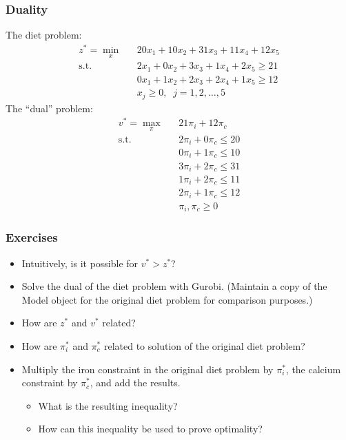 \documentclass[12pt,handout]{beamer}
\begin{document}
\begin{frame}
\frametitle{Duality}
\small
The diet problem:
\begin{eqnarray}
z^* = \min_x && 20x_1 + 10x_2 + 31x_3 + 11x_4 + 12x_5 \nonumber \\
\mbox{s.t.} && 2x_1 + 0x_2 + 3x_3 + 1x_4 + 2x_5 \ge 21 \nonumber \\
&& 0x_1 + 1x_2 + 2x_3 + 2x_4 + 1x_5 \ge 12 \nonumber \\
&& x_j \ge 0,\;\;j=1,2,\ldots, 5 \nonumber
\end{eqnarray}
The ``dual'' problem:
\begin{eqnarray}
v^* = \max_\pi && 21 \pi_i + 12 \pi_c \nonumber \\
\mbox{s.t.} && 2\pi_i + 0\pi_c \le 20 \nonumber \\
&& 0\pi_i + 1\pi_c \le 10 \nonumber \\
&& 3\pi_i + 2\pi_c \le 31 \nonumber \\
&& 1\pi_i + 2\pi_c \le 11 \nonumber \\
&& 2\pi_i + 1\pi_c \le 12 \nonumber \\
&& \pi_i, \pi_c \ge 0 \nonumber
\end{eqnarray}
\end{frame}

\begin{frame}
\frametitle{Exercises}
\begin{itemize}
\item Intuitively, is it possible for $v^* > z^*$?
\item Solve the dual of the diet problem with Gurobi. (Maintain a copy of the Model object for the original diet problem for comparison purposes.)
\item How are $z^*$ and $v^*$ related?
\item How are $\pi_i^*$ and $\pi_c^*$ related to solution of the original diet problem?
\item Multiply the iron constraint in the original diet problem by $\pi_i^*$, the calcium constraint by $\pi_c^*$, and add the results.
    \begin{itemize}
    \item What is the resulting inequality?
    \item How can this inequality be used to prove optimality?
    \end{itemize}
\end{itemize}
\end{frame}
\end{document}
